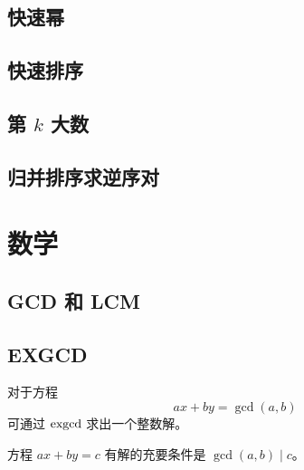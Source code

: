 \documentclass{probook}
\begin{document}
\begin{multicols}{2}
\section{快速幂}





\section{快速排序}



\section{\texorpdfstring{第 $k$ 大数}{第 k 大数}}



\section{归并排序求逆序对}









\chapter{数学}

\section{GCD 和 LCM}



\section{EXGCD}

对于方程 
\[ax+by=\gcd(a,b)\]
可通过 $\rm exgcd$ 求出一个整数解。



方程 $ax+by=c$ 有解的充要条件是 $\gcd(a,b) \mid c$。


\end{multicols}
\end{document}
